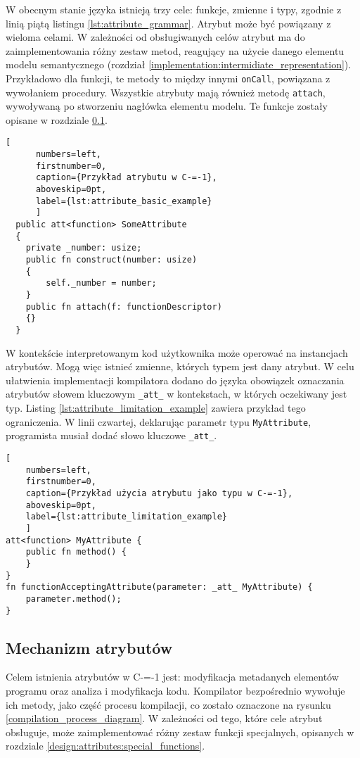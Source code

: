 W obecnym stanie języka istnieją trzy cele: funkcje, zmienne i typy, zgodnie z linią piątą listingu \ref{lst:attribute_grammar}.
Atrybut może być powiązany z wieloma celami.
W zależności od obsługiwanych celów atrybut ma do zaimplementowania różny zestaw metod, reagujący na użycie danego elementu modelu semantycznego (rozdział \ref{implementation:intermidiate_representation}).
Przykładowo dla funkcji, te metody to między innymi \lstinline{onCall}, powiązana z wywołaniem procedury.
Wszystkie atrybuty mają również metodę \lstinline{attach}, wywoływaną po stworzeniu nagłówka elementu modelu.
Te funkcje zostały opisane w rozdziale \ref{Attributes_mechanism_cm1}.

\begin{minipage}{\linewidth}
  
	\begin{lstlisting}[
	  numbers=left,
	  firstnumber=0,
	  caption={Przykład atrybutu w C-=-1},
	  aboveskip=0pt,
	  label={lst:attribute_basic_example}
	  ]
  public att<function> SomeAttribute
  {
	private _number: usize;
	public fn construct(number: usize)
	{
		self._number = number;
	}
	public fn attach(f: functionDescriptor)
	{}
  }
  \end{lstlisting}
\end{minipage}

W kontekście interpretowanym kod użytkownika może operować na instancjach atrybutów.
Mogą więc istnieć zmienne, których typem jest dany atrybut.
W celu ułatwienia implementacji kompilatora dodano do języka obowiązek oznaczania atrybutów słowem kluczowym \lstinline{_att_} w kontekstach, w których oczekiwany jest typ.
Listing \ref{lst:attribute_limitation_example} zawiera przykład tego ograniczenia.
W linii czwartej, deklarując parametr typu \lstinline{MyAttribute}, programista musiał dodać słowo kluczowe \lstinline{_att_}.

\begin{lstlisting}[
	numbers=left,
	firstnumber=0,
	caption={Przykład użycia atrybutu jako typu w C-=-1},
	aboveskip=0pt,
	label={lst:attribute_limitation_example}
	]
att<function> MyAttribute {
	public fn method() {
	}
}
fn functionAcceptingAttribute(parameter: _att_ MyAttribute) {
	parameter.method();
}
\end{lstlisting}
\subsection{Mechanizm atrybutów}
\label{Attributes_mechanism_cm1}

Celem istnienia atrybutów w C-=-1 jest: modyfikacja metadanych elementów programu oraz analiza i modyfikacja kodu.
Kompilator bezpośrednio wywołuje ich metody, jako część procesu kompilacji, co zostało oznaczone na rysunku \ref{compilation_process_diagram}.
W zależności od tego, które cele atrybut obsługuje, może zaimplementować różny zestaw funkcji specjalnych, opisanych w rozdziale \ref{design:attributes:special_functions}.

